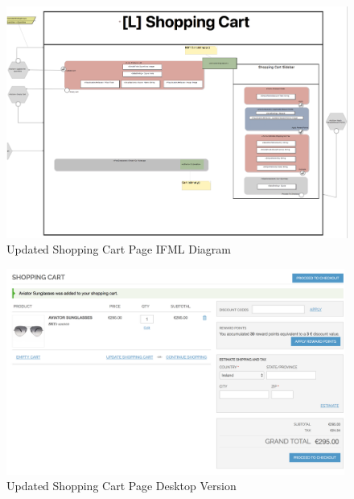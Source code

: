 \vspace{0.5cm}
\begin{figure}[H]
  \centering
    \includegraphics[width=14cm]{images/diagrams/after/ifml-shopping-cart.png}
  \caption{Updated Shopping Cart Page IFML Diagram}
  \label{fig:ifml-after-shopping-cart}
\end{figure}

\begin{figure}[H]
  \centering
    \includegraphics[width=14cm]{images/diagrams/after/desktop-shopping-cart.png}
  \caption{Updated Shopping Cart Page Desktop Version}
  \label{fig:desktop-after-shopping-cart}
\end{figure}
\vspace{0.5cm}





